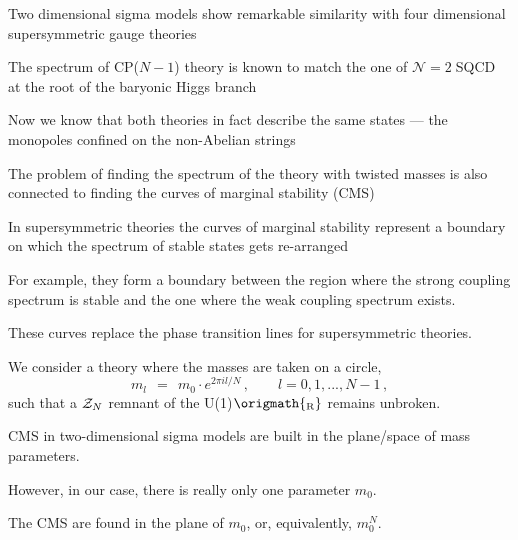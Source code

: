 \documentclass[12pt,letterpaper,landscape,KOMA,smallheadings,calcdimensions,display]{powersem}
\newcommand{\ntwo}{${\mathcal N}=2\;$}
\begin{document}
\begin{slide}
\vspace*{1cm}

Two dimensional sigma models show remarkable similarity with four dimensional
supersymmetric gauge theories

The spectrum of CP($N-1$) theory is known to match the one of \ntwo SQCD at the
root of the baryonic Higgs branch

Now we know that both theories in fact describe the same states --- the monopoles
confined on the non-Abelian strings

\end{slide}

\begin{slide}
\vspace*{1cm}

The problem of finding the spectrum of the theory with twisted masses is also
connected to finding the curves of marginal stability (CMS)

In supersymmetric theories the curves of marginal stability represent a boundary
on which the spectrum of stable states gets re-arranged

For example, they form a boundary between the region where the strong coupling
spectrum is stable and the one where the weak coupling spectrum exists.

These curves replace the phase transition lines for supersymmetric theories.

\end{slide}


\begin{slide}
\vspace*{2cm}

We consider a theory where the masses are taken on a circle,
\[
	m_l ~~=~~ m_0 \cdot e^{2 \pi i l / N}\,,\qquad l=0,1, ..., N-1\,,
\]
such that a $ \mathcal{Z}_N $ remnant of the U(1)$\origmath{_\text{R}}$ remains unbroken.

CMS in two-dimensional sigma models are built in the plane/space of mass parameters.

However, in our case, there is really only one parameter $ m_0 $.

The CMS are found in the plane of $ m_0 $, or, equivalently, $ m_0^N $.

\end{slide}
\end{document}

